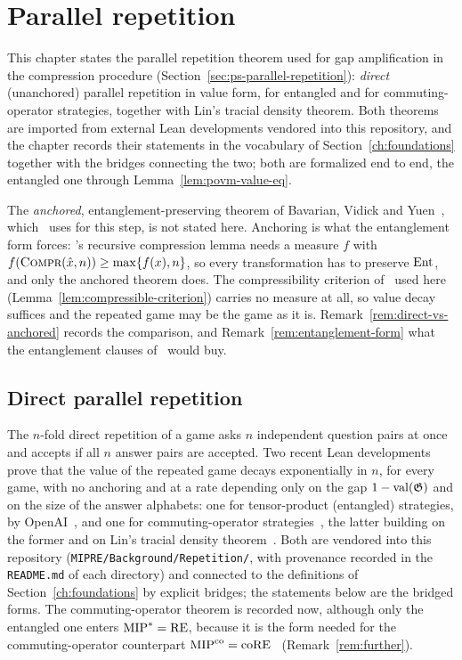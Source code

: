 \section{Parallel repetition}
\label{ch:parallel-repetition}

This chapter states the parallel repetition theorem used for gap amplification in the
compression procedure (Section~\ref{sec:ps-parallel-repetition}):
\emph{direct} (unanchored) parallel repetition in value form, for entangled and for
commuting-operator strategies, together with Lin's tracial density theorem. Both
theorems are imported from external Lean developments vendored into this repository,
and the chapter records their statements in the vocabulary of
Section~\ref{ch:foundations} together with the bridges connecting the two; both are
formalized end to end, the entangled one through Lemma~\ref{lem:povm-value-eq}.

The \emph{anchored}, entanglement-preserving theorem of Bavarian, Vidick and
Yuen~\cite{BVY17}, which~\cite{JNVWY20} uses for this step, is not stated here.
Anchoring is what the entanglement form forces: \cite{MNY}'s recursive compression
lemma needs a measure $f$ with $f(\textsc{Compr}(\hat x, n)) \geq \max\{f(x), n\}$, so every
transformation has to preserve $\mathrm{Ent}$, and only the anchored theorem does. The
compressibility criterion of~\cite{Lin25} used here (Lemma~\ref{lem:compressible-criterion})
carries no measure at all, so value decay suffices and the repeated game may be the
game as it is. Remark~\ref{rem:direct-vs-anchored} records the comparison, and
Remark~\ref{rem:entanglement-form} what the entanglement clauses of~\cite{JNVWY20}
would buy.

\subsection{Direct parallel repetition}
\label{sec:pr-direct}

The $n$-fold direct repetition of a game asks $n$ independent question pairs at once and
accepts if all $n$ answer pairs are accepted. Two recent Lean developments prove that
the value of the repeated game decays exponentially in $n$, for every game, with no
anchoring and at a rate depending only on the gap $1 - \mathrm{val}(\mathfrak{G})$ and on the size of
the answer alphabets: one for tensor-product (entangled) strategies, by
OpenAI~\cite{OpenAI26}, and one for commuting-operator strategies~\cite{Vid26}, the
latter building on the former and on Lin's tracial density theorem~\cite{Lin23}. Both
are vendored into this repository (\texttt{MIPRE/Background/Repetition/}, with
provenance recorded in the \texttt{README.md} of each directory) and connected to the
definitions of Section~\ref{ch:foundations} by explicit bridges; the statements below
are the bridged forms. The commuting-operator theorem is recorded now, although only
the entangled one enters $\mathrm{MIP}^* = \mathrm{RE}$, because it is the form needed for the
commuting-operator counterpart $\mathrm{MIP}^{\mathrm{co}} = \mathrm{coRE}$~\cite{Lin25} (Remark~\ref{rem:further}).

